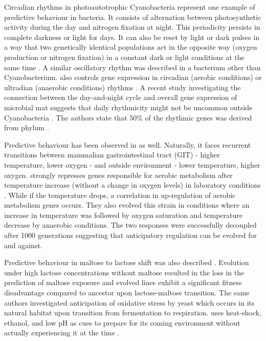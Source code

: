 Circadian rhythms in photoautotrophic Cyanobacteria represent one example of predictive behaviour in bacteria.
It consists of alternation between photosynthetic activity during the day and nitrogen fixation at night.
This periodicity persists in complete darkness or light for days.
It can also be reset by light or dark pulses in a way that two genetically identical populations act in the opposite way (oxygen production or nitrogen fixation) in a constant dark or light conditions at the same time \cite{kondo1993circadian}.
A similar oscillatory rhythm was described in a bacterium other than Cyanobacterium.
 also controls gene expression in circadian (aerobic conditions) or ultradian (anaerobic conditions) rhythms \cite{min2005rhythmic}.
A recent study investigating the connection between the day-and-night cycle and overall gene expression of microbial mat suggests that daily rhythmicity might not be uncommon outside Cyanobacteria \cite{hornlein2018daily}.
The authors state that 50\% of the rhythmic genes was derived from phylum .

Predictive behaviour has been observed in  as well.
Naturally, it faces recurrent transitions between mammalian gastrointestinal tract (GIT) - higher temperature, lower oxygen - and outside environment - lower temperature, higher oxygen.
 strongly represses genes responsible for aerobic metabolism after temperature increase (without a change in oxygen levels) in laboratory conditions \cite{tagkopoulos2008predictive}.
While if the temperature drops, a correlation in up-regulation of aerobic metabolism genes occurs.
They also evolved this strain in conditions where an increase in temperature was followed by oxygen saturation and temperature decrease by anaerobic conditions.
The two responses were successfully decoupled after 1000 generations suggesting that anticipatory regulation can be evolved for and against.

Predictive behaviour in maltose to lactose shift was also described \cite{mitchell2009adaptive}.
Evolution under high lactose concentrations without maltose resulted in the loss in the prediction of maltose exposure and evolved lines exhibit a significant fitness disadvantage compared to ancestor upon lactose-maltose transition.
The same authors investigated anticipation of oxidative stress by yeast which occurs in its natural habitat upon transition from fermentation to respiration.
 uses heat-shock, ethanol, and low pH as cues to prepare for its coming environment without actually experiencing it at the time \cite{mitchell2009adaptive}.


